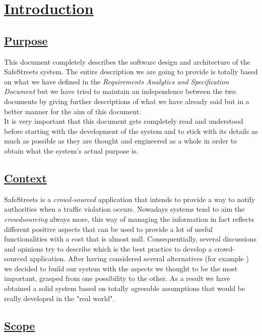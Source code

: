 \section[Introduction]{\hyperlink{toc}{Introduction}}
	\label{sec:introduction} 
	
	\subsection[Purpose]{\hyperlink{toc}{Purpose}}
		\label{sec:purpose}
		
			This document completely describes the software design and architecture of the SafeStreets system. The entire description we are going to provide is totally based on what we have defined in the \emph{Requirements Analytics and Specification Document} \cite{RASD} but we have tried to maintain an independence between the two documents by giving further descriptions of what we have already said but in a better manner for the aim of this document.\\
		
			It is very important that this document gets completely read and understood before starting with the development of the system and to stick with its details as much as possible as they are thought and engineered as a whole in order to obtain what the system's actual purpose is.
			
	\subsection[Context]{\hyperlink{toc}{Context}}
		\label{sec:context}
		
		SafeStreets is a \emph{crowd-sourced} application that intends to provide a way to notify authorities when a traffic violation occurs. Nowadays systems tend to aim the \emph{crowdsourcing} always more, this way of managing the information in fact reflects different positive aspects that can be used to provide a lot of useful functionalities with a cost that is almost null. Consequentially, several discussions and opinions try to describe which is the best practice to develop a crowd-sourced application. After having considered several alternatives (for example \cite{CB}) we decided to build our system with the aspects we thought to be the most important, grasped from one possibility to the other. As a result we have obtained a solid system based on totally agreeable assumptions that would be really developed in the "real world". 
		
	\subsection[Scope]{\hyperlink{toc}{Scope}}
		\label{sec:scope}
		
